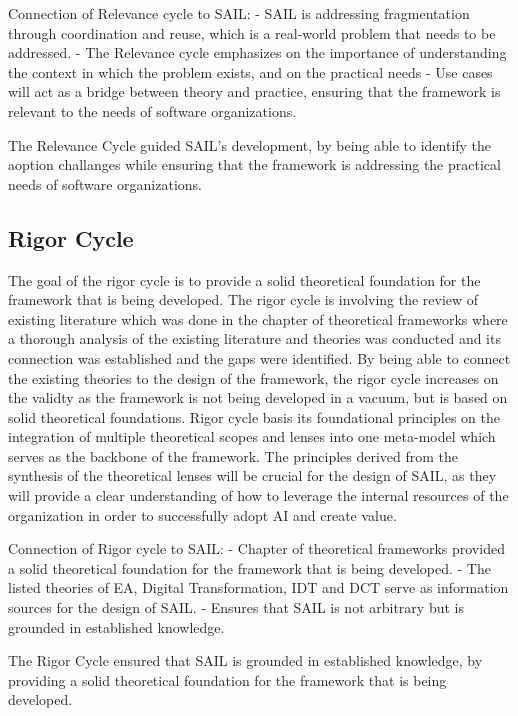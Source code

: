 \documentclass[]{imc-inf}
\begin{document}
Connection of Relevance cycle to SAIL: - SAIL is addressing
fragmentation through coordination and reuse, which is a real-world
problem that needs to be addressed. - The Relevance cycle emphasizes on
the importance of understanding the context in which the problem exists,
and on the practical needs - Use cases will act as a bridge between
theory and practice, ensuring that the framework is relevant to the
needs of software organizations.

The Relevance Cycle guided SAIL's development, by being able to identify
the aoption challanges while ensuring that the framework is addressing
the practical needs of software organizations.

\subsection{Rigor Cycle}\label{rigor-cycle}

The goal of the rigor cycle is to provide a solid theoretical foundation
for the framework that is being developed. The rigor cycle is involving
the review of existing literature which was done in the chapter of
theoretical frameworks where a thorough analysis of the existing
literature and theories was conducted and its connection was established
and the gaps were identified. By being able to connect the existing
theories to the design of the framework, the rigor cycle increases on
the validty as the framework is not being developed in a vacuum, but is
based on solid theoretical foundations. Rigor cycle basis its
foundational principles on the integration of multiple theoretical
scopes and lenses into one meta-model which serves as the backbone of
the framework. The principles derived from the synthesis of the
theoretical lenses will be crucial for the design of SAIL, as they will
provide a clear understanding of how to leverage the internal resources
of the organization in order to successfully adopt AI and create value.

Connection of Rigor cycle to SAIL: - Chapter of theoretical frameworks
provided a solid theoretical foundation for the framework that is being
developed. - The listed theories of EA, Digital Transformation, IDT and
DCT serve as information sources for the design of SAIL. -
Ensures that SAIL is not arbitrary but is grounded in established
knowledge.

The Rigor Cycle ensured that SAIL is grounded in established knowledge,
by providing a solid theoretical foundation for the framework that is
being developed.
\end{document}
